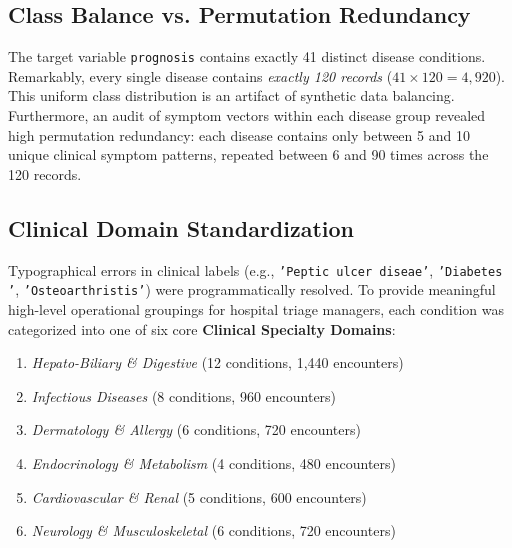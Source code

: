 \documentclass[conference]{IEEEtran}
\begin{document}
\subsection{Class Balance vs. Permutation Redundancy}
The target variable \texttt{prognosis} contains exactly 41 distinct disease conditions. Remarkably, every single disease contains \textit{exactly 120 records} ($41 \times 120 = 4,920$). This uniform class distribution is an artifact of synthetic data balancing. 
Furthermore, an audit of symptom vectors within each disease group revealed high permutation redundancy: each disease contains only between 5 and 10 unique clinical symptom patterns, repeated between 6 and 90 times across the 120 records.

\subsection{Clinical Domain Standardization}
Typographical errors in clinical labels (e.g., \texttt{'Peptic ulcer diseae'}, \texttt{'Diabetes '}, \texttt{'Osteoarthristis'}) were programmatically resolved. To provide meaningful high-level operational groupings for hospital triage managers, each condition was categorized into one of six core \textbf{Clinical Specialty Domains}:
\begin{enumerate}[noitemsep]
    \item \textit{Hepato-Biliary \& Digestive} (12 conditions, 1,440 encounters)
    \item \textit{Infectious Diseases} (8 conditions, 960 encounters)
    \item \textit{Dermatology \& Allergy} (6 conditions, 720 encounters)
    \item \textit{Endocrinology \& Metabolism} (4 conditions, 480 encounters)
    \item \textit{Cardiovascular \& Renal} (5 conditions, 600 encounters)
    \item \textit{Neurology \& Musculoskeletal} (6 conditions, 720 encounters)
\end{enumerate}
\end{document}
